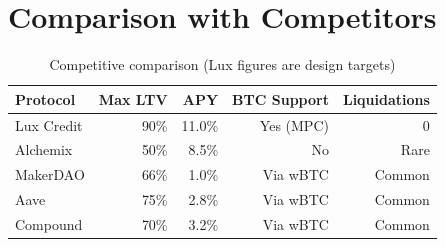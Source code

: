 \section{Comparison with Competitors}


\begin{table}[h]
\centering
\small
\begin{tabular}{@{}lrrrr@{}}
\toprule
\textbf{Protocol} & \textbf{Max LTV} & \textbf{APY} & \textbf{BTC Support} & \textbf{Liquidations} \\ \midrule
Lux Credit & 90\% & 11.0\% & Yes (MPC) & 0 \\
Alchemix & 50\% & 8.5\% & No & Rare \\
MakerDAO & 66\% & 1.0\% & Via wBTC & Common \\
Aave & 75\% & 2.8\% & Via wBTC & Common \\
Compound & 70\% & 3.2\% & Via wBTC & Common \\ \bottomrule
\end{tabular}
\caption{Competitive comparison (Lux figures are design targets)}
\end{table}

